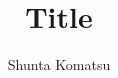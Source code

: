 \documentclass[a4paper,12pt]{jreport}
\begin{document}
\title{Title}
\author{Shunta Komatsu}

\maketitle
\end{document}
